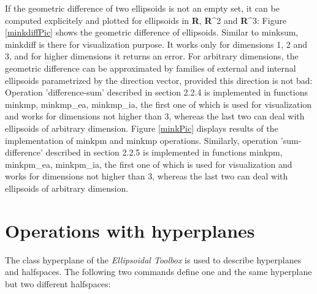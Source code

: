 \documentclass[letterpaper,10pt,english]{sphinxmanual}
\begin{document}
If the geometric difference of two ellipsoids is not an empty set, it
can be computed explicitely and plotted for ellipsoids in
{\bf R}, {\bf R}^2 and {\bf R}^3: Figure
\ref{minkdiffPic} shows the geometric difference of ellipsoids.
Similar to minksum, minkdiff is there for visualization purpose. It
works only for dimensions 1, 2 and 3, and for
higher dimensions it returns an error. For arbitrary dimensions, the
geometric difference can be approximated by families of external and
internal ellipsoids parametrized by the direction vector, provided this
direction is not bad: Operation ’difference-sum’ described in section
2.2.4 is implemented in functions minkmp, minkmp\_ea, minkmp\_ia, the
first one of which is used for visualization and works for dimensions
not higher than 3, whereas the last two can deal with ellipsoids
of arbitrary dimension. Figure \ref{minkPic} displays results of
the implementation of minkpm and minkmp operations. Similarly, operation
’sum-difference’ described in section 2.2.5 is implemented in functions
minkpm, minkpm\_ea, minkpm\_ia, the first one of which is used for
visualization and works for dimensions not higher than 3,
whereas the last two can deal with ellipsoids of arbitrary dimension.


\section{Operations with hyperplanes}
\label{chap_implement:operations-with-hyperplanes}
The class hyperplane of the \emph{Ellipsoidal Toolbox} is used to describe
hyperplanes and halfspaces. The following two commands define one and
the same hyperplane but two different halfspaces:
\end{document}
